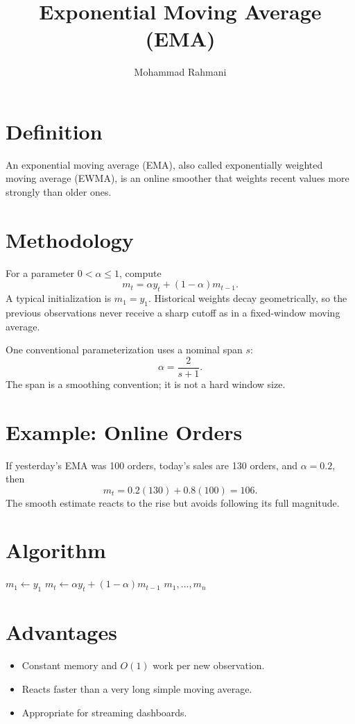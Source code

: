 \documentclass[a4paper]{article}
\title{Exponential Moving Average (EMA)}
\date{}
\author{Mohammad Rahmani}
\begin{document}
\maketitle

\section{Definition}
An exponential moving average (EMA), also called exponentially weighted moving average (EWMA), is an online smoother that weights recent values more strongly than older ones.

\section{Methodology}
For a parameter $0<\alpha\leq1$, compute
\[
 m_t=\alpha y_t+(1-\alpha)m_{t-1}.
\]
A typical initialization is $m_1=y_1$. Historical weights decay geometrically, so the previous observations never receive a sharp cutoff as in a fixed-window moving average.

One conventional parameterization uses a nominal span $s$:
\[
 \alpha=\frac{2}{s+1}.
\]
The span is a smoothing convention; it is not a hard window size.

\section{Example: Online Orders}
If yesterday's EMA was 100 orders, today's sales are 130 orders, and $\alpha=0.2$, then
\[
 m_t=0.2(130)+0.8(100)=106.
\]
The smooth estimate reacts to the rise but avoids following its full magnitude.

\section{Algorithm}
\begin{algorithm}[H]
\caption{Causal EMA update}
\begin{algorithmic}[1]
 \State $m_1\gets y_1$
    \State $m_t\gets \alpha y_t+(1-\alpha)m_{t-1}$
 \EndFor
 \State \Return $m_1,\ldots,m_n$
\end{algorithmic}
\end{algorithm}

\section{Advantages}
\begin{itemize}
 \item Constant memory and $O(1)$ work per new observation.
 \item Reacts faster than a very long simple moving average.
 \item Appropriate for streaming dashboards.
\end{itemize}
\end{document}
